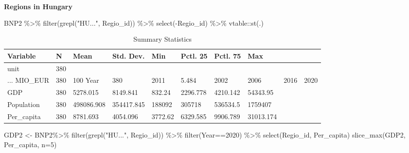 \documentclass[
]{article}
\newenvironment{Shaded}{\begin{snugshade}}{\end{snugshade}}
\newcommand{\AttributeTok}[1]{\textcolor[rgb]{0.77,0.63,0.00}{#1}}
\newcommand{\DecValTok}[1]{\textcolor[rgb]{0.00,0.00,0.81}{#1}}
\newcommand{\FunctionTok}[1]{\textcolor[rgb]{0.00,0.00,0.00}{#1}}
\newcommand{\NormalTok}[1]{#1}
\newcommand{\OtherTok}[1]{\textcolor[rgb]{0.56,0.35,0.01}{#1}}
\newcommand{\SpecialCharTok}[1]{\textcolor[rgb]{0.00,0.00,0.00}{#1}}
\newcommand{\StringTok}[1]{\textcolor[rgb]{0.31,0.60,0.02}{#1}}
\begin{document}
\textbf{Regions in Hungary}

\begin{Shaded}
\begin{Highlighting}[]
\NormalTok{BNP2 }\SpecialCharTok{\%\textgreater{}\%}
  \FunctionTok{filter}\NormalTok{(}\FunctionTok{grepl}\NormalTok{(}\StringTok{"HU..."}\NormalTok{, Regio\_id)) }\SpecialCharTok{\%\textgreater{}\%}
  \FunctionTok{select}\NormalTok{(}\SpecialCharTok{{-}}\NormalTok{Regio\_id) }\SpecialCharTok{\%\textgreater{}\%}
\NormalTok{  vtable}\SpecialCharTok{::}\FunctionTok{st}\NormalTok{(.)}
\end{Highlighting}
\end{Shaded}

\begin{table}

\caption{\label{tab:unnamed-chunk-8}Summary Statistics}
\centering
\begin{tabular}[t]{llllllll}
\toprule
Variable & N & Mean & Std. Dev. & Min & Pctl. 25 & Pctl. 75 & Max\\
\midrule
unit & 380 &  &  &  &  &  & \\
... MIO_EUR & 380 & 100%
Year & 380 & 2011 & 5.484 & 2002 & 2006 & 2016 & 2020\\
GDP & 380 & 5278.015 & 8149.841 & 832.24 & 2296.778 & 4210.142 & 54343.95\\
Population & 380 & 498086.908 & 354417.845 & 188092 & 305718 & 536534.5 & 1759407\\
\addlinespace
Per_capita & 380 & 8781.693 & 4054.096 & 3772.62 & 6329.585 & 9906.789 & 31013.174\\
\bottomrule
\end{tabular}
\end{table}

\begin{Shaded}
\begin{Highlighting}[]
\NormalTok{GDP2 }\OtherTok{\textless{}{-}}\NormalTok{ BNP2}\SpecialCharTok{\%\textgreater{}\%}
  \FunctionTok{filter}\NormalTok{(}\FunctionTok{grepl}\NormalTok{(}\StringTok{"HU..."}\NormalTok{, Regio\_id)) }\SpecialCharTok{\%\textgreater{}\%}
  \FunctionTok{filter}\NormalTok{(Year}\SpecialCharTok{==}\DecValTok{2020}\NormalTok{) }\SpecialCharTok{\%\textgreater{}\%}
  \FunctionTok{select}\NormalTok{(Regio\_id, Per\_capita)}
\FunctionTok{slice\_max}\NormalTok{(GDP2, Per\_capita, }\AttributeTok{n=}\DecValTok{5}\NormalTok{)}
\end{Highlighting}
\end{Shaded}
\end{document}
